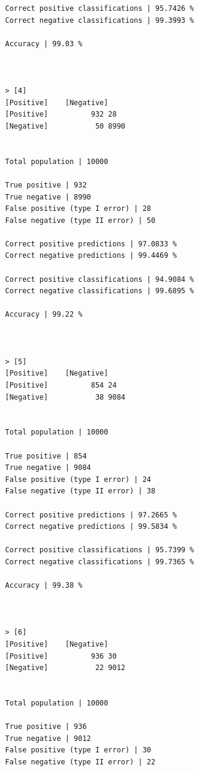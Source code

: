 \documentclass{classrep}
\begin{document}
{{{\begin{lstlisting}
                Correct positive classifications | 95.7426 %
                Correct negative classifications | 99.3993 %

                Accuracy | 99.03 %



                > [4]
                [Positive]    [Negative]
                [Positive]          932 28
                [Negative]           50 8990


                Total population | 10000

                True positive | 932
                True negative | 8990
                False positive (type I error) | 28
                False negative (type II error) | 50

                Correct positive predictions | 97.0833 %
                Correct negative predictions | 99.4469 %

                Correct positive classifications | 94.9084 %
                Correct negative classifications | 99.6895 %

                Accuracy | 99.22 %



                > [5]
                [Positive]    [Negative]
                [Positive]          854 24
                [Negative]           38 9084


                Total population | 10000

                True positive | 854
                True negative | 9084
                False positive (type I error) | 24
                False negative (type II error) | 38

                Correct positive predictions | 97.2665 %
                Correct negative predictions | 99.5834 %

                Correct positive classifications | 95.7399 %
                Correct negative classifications | 99.7365 %

                Accuracy | 99.38 %



                > [6]
                [Positive]    [Negative]
                [Positive]          936 30
                [Negative]           22 9012


                Total population | 10000

                True positive | 936
                True negative | 9012
                False positive (type I error) | 30
                False negative (type II error) | 22


\end{lstlisting}}}}
\end{document}
